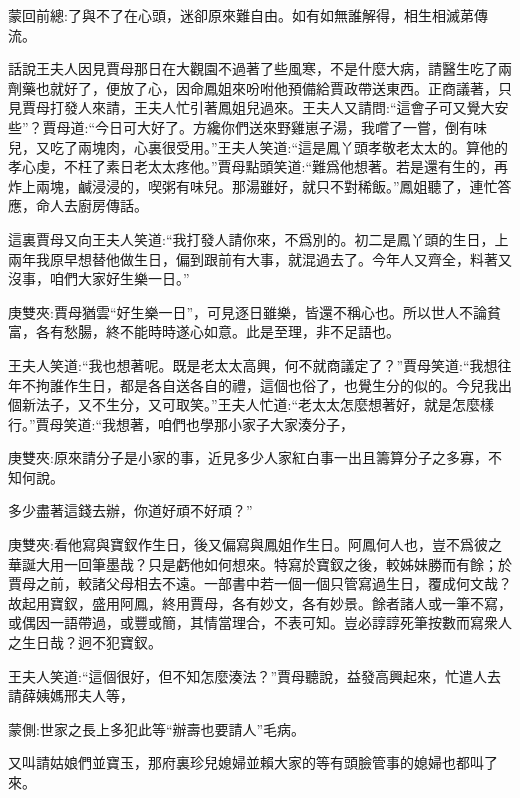 

\begin{parag}
    \begin{note}蒙回前總:了與不了在心頭，迷卻原來難自由。如有如無誰解得，相生相滅苐傳流。\end{note}
\end{parag}


\begin{parag}
    話說王夫人因見賈母那日在大觀園不過著了些風寒，不是什麼大病，請醫生吃了兩劑藥也就好了，便放了心，因命鳳姐來吩咐他預備給賈政帶送東西。正商議著，只見賈母打發人來請，王夫人忙引著鳳姐兒過來。王夫人又請問:“這會子可又覺大安些”？賈母道:“今日可大好了。方纔你們送來野雞崽子湯，我嚐了一嘗，倒有味兒，又吃了兩塊肉，心裏很受用。”王夫人笑道:“這是鳳丫頭孝敬老太太的。算他的孝心虔，不枉了素日老太太疼他。”賈母點頭笑道:“難爲他想著。若是還有生的，再炸上兩塊，鹹浸浸的，喫粥有味兒。那湯雖好，就只不對稀飯。”鳳姐聽了，連忙答應，命人去廚房傳話。
\end{parag}


\begin{parag}
    這裏賈母又向王夫人笑道:“我打發人請你來，不爲別的。初二是鳳丫頭的生日，上兩年我原早想替他做生日，偏到跟前有大事，就混過去了。今年人又齊全，料著又沒事，咱們大家好生樂一日。”\begin{note}庚雙夾:賈母猶雲“好生樂一日”，可見逐日雖樂，皆還不稱心也。所以世人不論貧富，各有愁腸，終不能時時遂心如意。此是至理，非不足語也。\end{note}王夫人笑道:“我也想著呢。既是老太太高興，何不就商議定了？”賈母笑道:“我想往年不拘誰作生日，都是各自送各自的禮，這個也俗了，也覺生分的似的。今兒我出個新法子，又不生分，又可取笑。”王夫人忙道:“老太太怎麼想著好，就是怎麼樣行。”賈母笑道:“我想著，咱們也學那小家子大家湊分子，\begin{note}庚雙夾:原來請分子是小家的事，近見多少人家紅白事一出且籌算分子之多寡，不知何說。\end{note}多少盡著這錢去辦，你道好頑不好頑？”\begin{note}庚雙夾:看他寫與寶釵作生日，後又偏寫與鳳姐作生日。阿鳳何人也，豈不爲彼之華誕大用一回筆墨哉？只是虧他如何想來。特寫於寶釵之後，較姊妹勝而有餘；於賈母之前，較諸父母相去不遠。一部書中若一個一個只管寫過生日，覆成何文哉？故起用寶釵，盛用阿鳳，終用賈母，各有妙文，各有妙景。餘者諸人或一筆不寫，或偶因一語帶過，或豐或簡，其情當理合，不表可知。豈必諄諄死筆按數而寫衆人之生日哉？迥不犯寶釵。\end{note}王夫人笑道:“這個很好，但不知怎麼湊法？”賈母聽說，益發高興起來，忙遣人去請薛姨媽邢夫人等，\begin{note}蒙側:世家之長上多犯此等“辦壽也要請人”毛病。\end{note}又叫請姑娘們並寶玉，那府裏珍兒媳婦並賴大家的等有頭臉管事的媳婦也都叫了來。
\end{parag}


